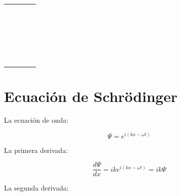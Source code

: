 \begin{center}
\begin{tabular}{ c | c | c | c }
      & \makecell{
      \color{gray}{$1.381\times 10^{-23}$}\\
      \color{gray}{$8.617\times 10^{-5}$}\\
      \color{gray}{$6.626\times 10^{-34}$}\\
      \color{gray}{$1.602\times 10^{-19}$}\\
      \color{gray}{$0.026$}\\
      \color{gray}{$1\times
10^{10}$ ($@ T=300K$)}\\
      \color{gray}{$1.2$ ($@ T=300K$)}\\
      \color{gray}{$8.854\times
10^{-12}$}\\
      \color{gray}{$8.854\times
10^{-14}$}\\
      \color{gray}{$11.7 \varepsilon _{o}$}\\
      \color{gray}{$3.97 \varepsilon _{o}$}
      }
      
      & \makecell{
      \color{gray}{$J\cdot{}K^{-1}$}\\
      \color{gray}{$eV\cdot{}K^{-1}$}\\
      \color{gray}{$J\cdot{}s$}\\
      \color{gray}{C}\\
      \color{gray}{V}\\
      \color{gray}{cm$^{-3}$}\\
      \color{gray}{eV}\\
      \color{gray}{C$^{2}$ N$^{-1}$ m$^{-2}$}\\
      \color{gray}{F cm$^{-1}$}\\
      \color{gray}{F cm$^{-1}$}\\
      \color{gray}{F cm$^{-1}$}
      }
      
      \\
      \hline
    \end{tabular}
\end{center}

\section*{Ecuación de Schrödinger}

La ecuación de onda:

\[ \Psi = e^{i(kx - \omega t)} \]

La primera derivada:

\[ \dfrac{d\Psi}{dx} = ik e^{i(kx - \omega t)} = ik\Psi \]

La segunda derivada:

